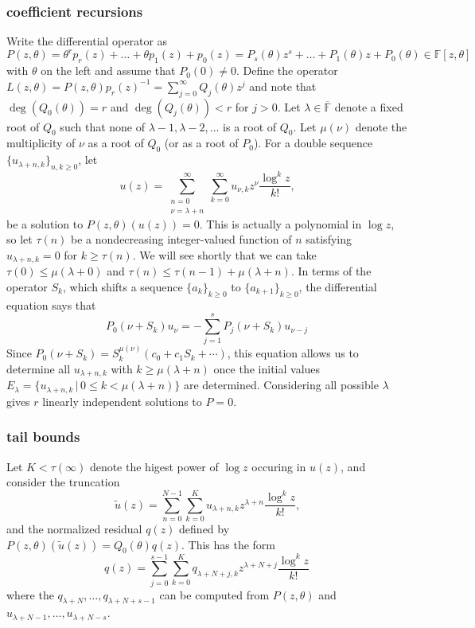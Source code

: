 \documentclass[10pt]{article}
\numberwithin{equation}{section}
\begin{document}
\subsubsection{coefficient recursions}
Write the differential operator as $P(z,\theta) = \theta^r p_r(z) + \dots + \theta p_1(z) + p_0(z) = P_s(\theta) z^s + \dots + P_1(\theta) z + P_0(\theta) \in\mathbb{F}[z,\theta]$ with $\theta$ on the left and assume that $P_0(0) \neq 0$. Define the operator $L(z,\theta) = P(z,\theta) p_r(z)^{-1} = \sum_{j=0}^{\infty} Q_j(\theta) z^j$ and note that $\deg(Q_0(\theta)) = r$ and $\deg(Q_j(\theta)) < r$ for $j > 0$. Let $\lambda \in \overline{\mathbb{F}}$ denote a fixed root of $Q_0$ such that none of $\lambda-1, \lambda-2, \dots$ is a root of $Q_0$. Let $\mu(\nu)$ denote the multiplicity of $\nu$ as a root of $Q_0$ (or as a root of $P_0$). For a double sequence $\{u_{\lambda + n, k}\}_{n,k \ge 0}$, let
\begin{equation*}
u(z) = \sum_{\substack{n=0 \\ \nu=\lambda+n}}^{\infty} \sum_{k=0}^{\infty} u_{\nu,k} z^{\nu} \frac{\log^k z}{k!}\text{,}
\end{equation*}
be a solution to $P(z,\theta)(u(z)) = 0$. This is actually a polynomial in $\log z$, so let $\tau(n)$ be a nondecreasing integer-valued function of $n$ satisfying 
$u_{\lambda+n, k} = 0$ for $k \ge \tau(n)$. We will see shortly that we can take $\tau(0) \le \mu(\lambda + 0)$ and $\tau(n) \le \tau(n-1)+\mu(\lambda+n)$. In terms of the operator $S_k$, which shifts a sequence $\{a_k\}_{k \ge 0}$ to $\{a_{k+1}\}_{k \ge 0}$, the differential equation says that
\begin{equation*}
P_0(\nu + S_k) u_{\nu} = - \sum_{j=1}^{s} P_j(\nu + S_k) u_{\nu - j}
\end{equation*}
Since $P_0(\nu + S_k) = S_k^{\mu(\nu)}( c_0 + c_1 S_k + \cdots )$, this equation allows us to determine all $u_{\lambda+n, k}$ with $k \ge \mu(\lambda+n)$ once the initial values $E_{\lambda} = \{u_{\lambda+n, k} \, | \, 0 \le k < \mu(\lambda+n)\}$ are determined. Considering all possible $\lambda$ gives $r$ linearly independent solutions to $P=0$.

\subsubsection{tail bounds}
Let $K < \tau(\infty)$ denote the higest power of $\log z$ occuring in $u(z)$, and consider the truncation
\begin{equation*}
\tilde{u}(z) = \sum_{n=0}^{N-1} \sum_{k=0}^{K} u_{\lambda + n,k} z^{\lambda + n} \frac{\log^k z}{k!}\text{,}
\end{equation*}
and the normalized residual $q(z)$ defined by $P(z,\theta)(\tilde{u}(z)) = Q_0(\theta) q(z)$. This has the form
\begin{equation*}
q(z) = \sum_{j=0}^{s-1} \sum_{k = 0}^{K} q_{\lambda + N + j, k} z^{\lambda + N + j} \frac{\log^k z}{k!}
\end{equation*}
where the $q_{\lambda+N}, \dots, q_{\lambda+N+s-1}$ can be computed from $P(z,\theta)$ and $u_{\lambda+N-1}, \dots, u_{\lambda+N-s}$.
\end{document}
